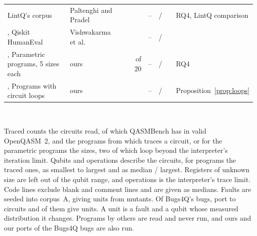 \begin{table}[t]
\begin{tabularx}{\textwidth}{@{}>{\raggedright\arraybackslash}X >{\raggedright\arraybackslash}p{3.05cm}
                  r r r r r >{\raggedright\arraybackslash}p{2.2cm}@{}}
    LintQ's corpus & Paltenghi and Pradel~\cite{paltenghi2024lintq} & \numSubjLintqCount{} & \numSubjLintqTraced{} &
      \numSubjLintqMinQubits{}--\numSubjLintqMaxQubits{} & \numSubjLintqMedianOps{} / \numSubjLintqMaxOps{} & \numSubjLintqMedianLines{} & RQ4, LintQ comparison \\ \sep
    Qiskit HumanEval & Vishwakarma et al.~\cite{vishwakarma2024qhe} & \numSubjQheCount{} & \numSubjQheTraced{} &
      \numSubjQheMinQubits{}--\numSubjQheMaxQubits{} & \numSubjQheMedianOps{} / \numSubjQheMaxOps{} & \numSubjQheMedianLines{} & \tool{} \\ \sep
    Parametric programs, 5 sizes each & ours & \numSubjParamCount{} & \numSubjParamTraced{} of 20 &
      \numSubjParamMinQubits{}--\numSubjParamMaxQubits{} & \numSubjParamMedianOps{} / \numSubjParamMaxOps{} & \numSubjParamMedianLines{} & RQ4 \\ \sep
    Programs with circuit loops & ours & \numSubjCfCount{} & \numSubjCfTraced{} & \numSubjCfMinQubits{}--\numSubjCfMaxQubits{} &
      \numSubjCfMedianOps{} / \numSubjCfMaxOps{} & \numSubjCfMedianLines{} & Proposition~\ref{prop:loops} \\
    \bottomrule
  \end{tabularx}\\[3pt]
  \begin{minipage}{\textwidth}\footnotesize
  Traced counts the circuits read, of which QASMBench has \numSubjQbTraced{} in valid OpenQASM~2, and the programs from which
  \tool{} traces a circuit, or for the parametric programs the sizes, two of which loop beyond the interpreter's
  iteration limit. Qubits and operations describe the circuits, for programs the traced ones, as smallest to largest
  and as median / largest. Registers of unknown size are left out of the qubit range, and \numToolMaxOps{} operations is
  the interpreter's trace limit. Code lines exclude blank and comment lines and are given as medians. Faults are seeded
  into corpus~A, giving \numRqThreeUnits{} units from \numMutantsKilled{} mutants. Of Bugs4Q's bugs, \numBugsFourQIncluded{}
  port to circuits and \numBugsFourQKilled{} of them give \numLinesUnits{} units. A unit is a fault and a qubit whose
  measured distribution it changes.
  Programs by others are read and never run, and ours and our ports of the Bugs4Q bugs are also run.
  \end{minipage}
\end{table}


